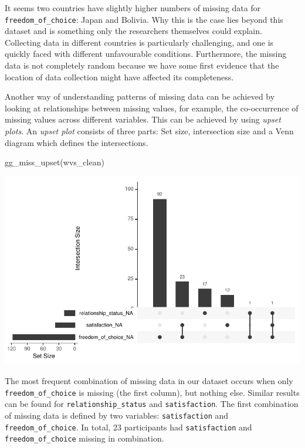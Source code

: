 \documentclass[
  letterpaper,
]{krantz}
\makeatletter
\newenvironment{Shaded}{\begin{snugshade}}{\end{snugshade}}
\newcommand{\FunctionTok}[1]{\textcolor[rgb]{0.28,0.35,0.67}{#1}}
\newcommand{\NormalTok}[1]{\textcolor[rgb]{0.00,0.23,0.31}{#1}}
\newenvironment{kframe}{%
\medskip{}
\setlength{\fboxsep}{.8em}
 \def\at@end@of@kframe{}%
 \ifinner\ifhmode%
  \def\at@end@of@kframe{\end{minipage}}%
  \begin{minipage}{\columnwidth}%
 \fi\fi%
 \def\FrameCommand##1{\hskip\@totalleftmargin \hskip-\fboxsep
 \colorbox{shadecolor}{##1}\hskip-\fboxsep
     \hskip-\linewidth \hskip-\@totalleftmargin \hskip\columnwidth}%
 \MakeFramed {\advance\hsize-\width
   \@totalleftmargin\z@ \linewidth\hsize
   \@setminipage}}%
 {\par\unskip\endMakeFramed%
 \at@end@of@kframe}
\renewenvironment{Shaded}{\begin{kframe}}{\end{kframe}}
\makeatother
\begin{document}
It seems two countries have slightly higher numbers of missing data for
\texttt{freedom\_of\_choice}: Japan and Bolivia. Why this is the case
lies beyond this dataset and is something only the researchers
themselves could explain. Collecting data in different countries is
particularly challenging, and one is quickly faced with different
unfavourable conditions. Furthermore, the missing data is not completely
random because we have some first evidence that the location of data
collection might have affected its completeness.

Another way of understanding patterns of missing data can be achieved by
looking at relationships between missing values, for example, the
co-occurrence of missing values across different variables. This can be
achieved by using \emph{upset plots}. An \emph{upset plot} consists of
three parts: Set size, intersection size and a Venn diagram which
defines the intersections.

\begin{Shaded}
\begin{Highlighting}[]
\FunctionTok{gg\_miss\_upset}\NormalTok{(wvs\_clean)}
\end{Highlighting}
\end{Shaded}

\includegraphics{07_data_wrangling_files/figure-pdf/upset-plot-1.pdf}

The most frequent combination of missing data in our dataset occurs when
only \texttt{freedom\_of\_choice} is missing (the first column), but
nothing else. Similar results can be found for
\texttt{relationship\_status} and \texttt{satisfaction}. The first
combination of missing data is defined by two variables:
\texttt{satisfaction} and \texttt{freedom\_of\_choice}. In total, 23
participants had \texttt{satisfaction} and \texttt{freedom\_of\_choice}
missing in combination.
\end{document}
